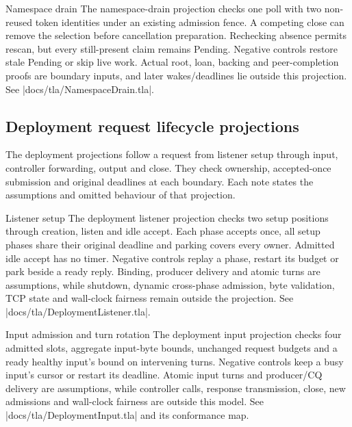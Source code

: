 \begin{implementationdetail}{Namespace drain}
The namespace-drain projection checks one poll with two non-reused token
identities under an existing admission fence. A competing close can remove the
selection before cancellation preparation. Rechecking absence permits rescan, but
every still-present claim remains Pending. Negative controls restore stale
Pending or skip live work. Actual root, loan, backing and peer-completion proofs
are boundary inputs, and later wakes/deadlines lie outside this projection.
See \repofile|docs/tla/NamespaceDrain.tla|.
\end{implementationdetail}

\subsection{Deployment request lifecycle projections}

The deployment projections follow a request from listener setup through input,
controller forwarding, output and close. They check ownership, accepted-once
submission and original deadlines at each boundary. Each note states the
assumptions and omitted behaviour of that projection.

\begin{implementationdetail}{Listener setup}
The deployment listener projection checks two setup positions through creation,
listen and idle accept. Each phase accepts once, all setup phases share their
original deadline and parking covers every owner. Admitted idle accept has no
timer. Negative controls replay a phase, restart its budget or park beside a
ready reply. Binding, producer delivery and atomic turns are assumptions, while
shutdown, dynamic cross-phase admission, byte validation, TCP state and
wall-clock fairness remain outside the projection. See
\repofile|docs/tla/DeploymentListener.tla|.
\end{implementationdetail}

\begin{implementationdetail}{Input admission and turn rotation}
The deployment input projection checks four admitted slots, aggregate input-byte
bounds, unchanged request budgets and a ready healthy input's bound on
intervening turns. Negative controls keep a busy input's cursor or restart
its deadline. Atomic input turns and producer/CQ delivery are assumptions, while
controller calls, response transmission, close, new admissions and wall-clock
fairness are outside this model. See
\repofile|docs/tla/DeploymentInput.tla| and its conformance map.
\end{implementationdetail}


